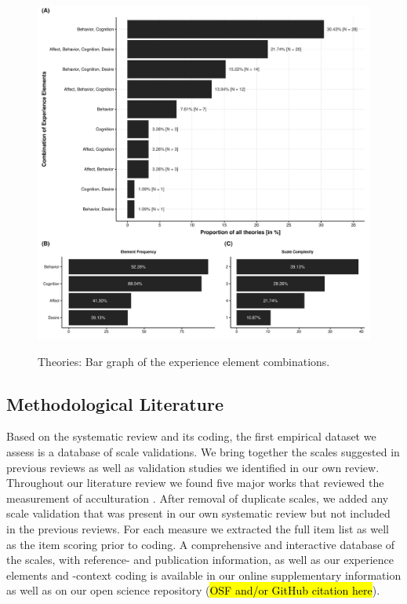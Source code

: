 \begin{figure}[h]
\centering
\caption{Theories: Bar graph of the experience element combinations.}
\includegraphics[width=\textwidth]{Figures/TheoriesFreq-1}
\label{fig:ElementsTheories}
\end{figure}



\subsection{Methodological Literature}

Based on the systematic review and its coding, the first empirical
dataset we assess is a database of scale validations. We bring together
the scales suggested in previous reviews as well as validation studies
we identified in our own review. Throughout our literature review we
found five major works that reviewed the measurement of acculturation
\citep{Celenk2011, Maestas2000, Matsudaira2006, Wallace2010, Zane2004}.
After removal of duplicate scales, we added any scale validation that
was present in our own systematic review but not included in the
previous reviews. For each measure we extracted the full item list as
well as the item scoring prior to coding. A comprehensive and
interactive database of the scales, with reference- and publication
information, as well as our experience elements and -context coding is
available in our online supplementary information as well as on our open
science repository (\hl{OSF and/or GitHub citation here}).

